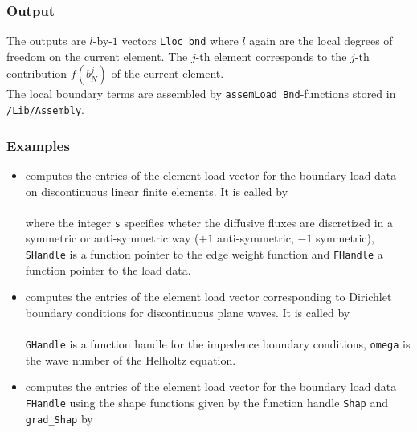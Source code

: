\subsubsection{Output}

 The outputs are $l$-by-$1$ vectors {\tt Lloc\_bnd} where $l$ again are the local degrees of freedom on the current element. The $j$-th element corresponds to the $j$-th contribution $f(b^j_N)$ of the current element. \\

 The local boundary terms are assembled by {\tt assemLoad\_Bnd}-functions stored in {\tt /Lib/Assembly}.

\subsubsection{Examples}

\begin{itemize}
\item {} computes the entries of the element load vector for the boundary load data on discontinuous linear finite elements. It is called by \\

 \\

 where the integer {\tt s} specifies wheter the diffusive fluxes are discretized in a symmetric or anti-symmetric way ($+1$ anti-symmetric, $-1$ symmetric), {\tt SHandle} is a function pointer to the edge weight function and {\tt FHandle} a function pointer to the load data. \\

\item {} computes the entries of the element load vector corresponding to Dirichlet boundary conditions for discontinuous plane waves. It is called by \\

 \\

 {\tt GHandle} is a function handle for the impedence boundary conditions, {\tt omega} is the wave number of the Helholtz equation. \\

\item {} computes the entries of the element load vector for the boundary load data {\tt FHandle} using the shape functions given by the function handle {\tt Shap} and {\tt grad\_Shap} by \\

\end{itemize}


